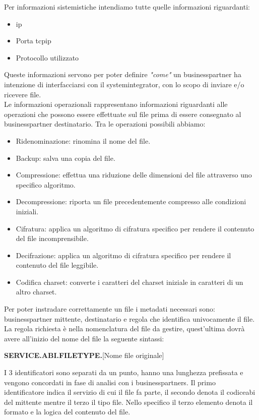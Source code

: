 Per informazioni sistemistiche intendiamo tutte quelle informazioni riguardanti:
\begin{itemize}
    \item \Gls{ip}
    \item Porta \gls{tcpip}
    \item Protocollo utilizzato
\end{itemize}
Queste informazioni servono per poter definire \textit{"come"} un \gls{businesspartner} ha intenzione di interfacciarsi con il \gls{systemintegrator}, con lo scopo di inviare e/o ricevere file. \\
Le informazioni operazionali rappresentano informazioni riguardanti alle operazioni che possono essere effettuate sul file prima di essere consegnato al \gls{businesspartner} destinatario. Tra le operazioni possibili abbiamo:
\begin{itemize}
    \item Ridenominazione: rinomina il nome del file.
    \item Backup: salva una copia del file.
    \item Compressione: effettua una riduzione delle dimensioni del file attraverso uno specifico algoritmo. 
    \item Decompressione: riporta un file precedentemente compresso alle condizioni iniziali.
    \item Cifratura: applica un algoritmo di cifratura specifico per rendere il contenuto del file incomprensibile.
    \item Decifrazione: applica un algoritmo di cifratura specifico per rendere il contenuto del file leggibile.
    \item Codifica \gls{charset}: converte i caratteri del \gls{charset} iniziale in caratteri di un altro \gls{charset}.
\end{itemize}

Per poter instradare correttamente un file i metadati necessari sono:  \gls{businesspartner} mittente, destinatario e regola che identifica univocamente il file. La regola richiesta è nella nomenclatura del file da gestire, quest'ultima dovrà avere all'inizio del nome del file la seguente sintassi:
\begin{center} \textbf{SERVICE.ABI.FILETYPE.}[Nome file originale]\end{center}

I 3 identificatori sono separati da un punto, hanno una lunghezza prefissata e vengono concordati in fase di analisi con i \glspl{businesspartner}. Il primo identificatore indica il servizio di cui il file fa parte, il secondo denota il \gls{codiceabi} del mittente mentre il terzo il tipo file. Nello specifico il terzo elemento denota il formato e la logica del contenuto del file.


